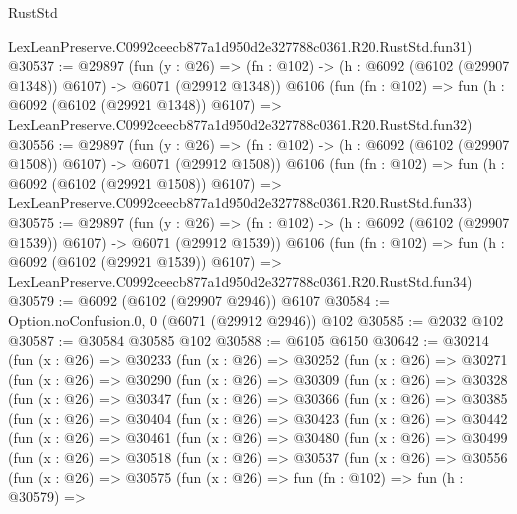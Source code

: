 \begin{lexlean}{RustStd}
\begin{coremodule}
    LexLeanPreserve.C0992ceecb877a1d950d2e327788c0361.R20.RustStd.fun31)
@30537 := @29897
    (fun (y : @26) =>
    (fn : @102) -> (h : @6092 (@6102 (@29907 @1348)) @6107) -> @6071 (@29912 @1348))
    @6106
    (fun (fn : @102) =>
    fun (h : @6092 (@6102 (@29921 @1348)) @6107) =>
    LexLeanPreserve.C0992ceecb877a1d950d2e327788c0361.R20.RustStd.fun32)
@30556 := @29897
    (fun (y : @26) =>
    (fn : @102) -> (h : @6092 (@6102 (@29907 @1508)) @6107) -> @6071 (@29912 @1508))
    @6106
    (fun (fn : @102) =>
    fun (h : @6092 (@6102 (@29921 @1508)) @6107) =>
    LexLeanPreserve.C0992ceecb877a1d950d2e327788c0361.R20.RustStd.fun33)
@30575 := @29897
    (fun (y : @26) =>
    (fn : @102) -> (h : @6092 (@6102 (@29907 @1539)) @6107) -> @6071 (@29912 @1539))
    @6106
    (fun (fn : @102) =>
    fun (h : @6092 (@6102 (@29921 @1539)) @6107) =>
    LexLeanPreserve.C0992ceecb877a1d950d2e327788c0361.R20.RustStd.fun34)
@30579 := @6092 (@6102 (@29907 @2946)) @6107
@30584 := Option.noConfusion.{0, 0} (@6071 (@29912 @2946)) @102
@30585 := @2032 @102
@30587 := @30584 @30585 @102
@30588 := @6105 @6150
@30642 := @30214
    (fun (x : @26) =>
    @30233
      (fun (x : @26) =>
      @30252
        (fun (x : @26) =>
        @30271
          (fun (x : @26) =>
          @30290
            (fun (x : @26) =>
            @30309
              (fun (x : @26) =>
              @30328
                (fun (x : @26) =>
                @30347
                  (fun (x : @26) =>
                  @30366
                    (fun (x : @26) =>
                    @30385
                      (fun (x : @26) =>
                      @30404
                        (fun (x : @26) =>
                        @30423
                          (fun (x : @26) =>
                          @30442
                            (fun (x : @26) =>
                            @30461
                              (fun (x : @26) =>
                              @30480
                                (fun (x : @26) =>
                                @30499
                                  (fun (x : @26) =>
                                  @30518
                                    (fun (x : @26) =>
                                    @30537
                                      (fun (x : @26) =>
                                      @30556
                                        (fun (x : @26) =>
                                        @30575
                                          (fun (x : @26) =>
                                          fun (fn : @102) =>
                                          fun (h : @30579) =>

\end{coremodule}
\end{lexlean}
